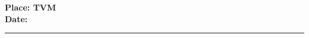 \begin{flushleft}
		\begin{minipage}{0.5\textwidth}
\vspace{2\baselineskip}
	{\bf Place: TVM \\}
{\bf Date: \reportSubmissionDate}
	\end{minipage}
	\end{flushleft}

\begin{flushright}
	\begin{minipage}{0.5\textwidth}
		\centering
		\hrule 
		\vspace{0.5\baselineskip}
		{\bf \firstAuthor  \firstAuthorID \\}
		{\bf \secondAuthor  \secondAuthorID\\} 
		{\bf \thirdAuthor  \thirdAuthorID\\} 
		{\bf \fourthAuthor  \fourthAuthorID\\}  \par
	\end{minipage}
	\end{flushright}

\thispagestyle{empty}